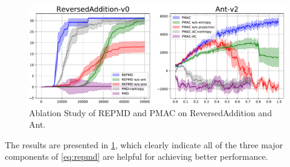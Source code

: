 \begin{figure}[t]
\centering
\includegraphics[width=0.5\linewidth]{./ablation-results.pdf} \vspace{-0.3cm} 
\caption{Ablation Study of REPMD and PMAC %
on ReversedAddition and Ant. }
\label{fig:ablation}
\vspace{-0.2cm}
\end{figure}

The results are presented in \cref{fig:ablation},
which clearly indicate all of the three major components of \cref{eq:repmd}
are helpful for achieving better performance. 

